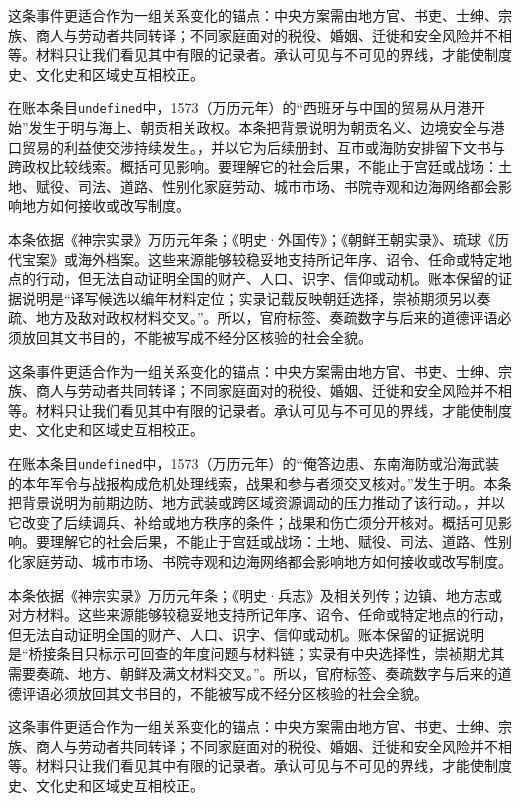 这条事件更适合作为一组关系变化的锚点：中央方案需由地方官、书吏、士绅、宗族、商人与劳动者共同转译；不同家庭面对的税役、婚姻、迁徙和安全风险并不相等。材料只让我们看见其中有限的记录者。承认可见与不可见的界线，才能使制度史、文化史和区域史互相校正。

在账本条目\texttt{undefined}中，1573（万历元年）的“西班牙与中国的贸易从月港开始”发生于明与海上、朝贡相关政权。本条把背景说明为朝贡名义、边境安全与港口贸易的利益使交涉持续发生。，并以它为后续册封、互市或海防安排留下文书与跨政权比较线索。概括可见影响。要理解它的社会后果，不能止于宫廷或战场：土地、赋役、司法、道路、性别化家庭劳动、城市市场、书院寺观和边海网络都会影响地方如何接收或改写制度。

本条依据《神宗实录》万历元年条；《明史·外国传》；《朝鲜王朝实录》、琉球《历代宝案》或海外档案。这些来源能够较稳妥地支持所记年序、诏令、任命或特定地点的行动，但无法自动证明全国的财产、人口、识字、信仰或动机。账本保留的证据说明是“译写候选以编年材料定位；实录记载反映朝廷选择，崇祯期须另以奏疏、地方及敌对政权材料交叉。”。所以，官府标签、奏疏数字与后来的道德评语必须放回其文书目的，不能被写成不经分区核验的社会全貌。

这条事件更适合作为一组关系变化的锚点：中央方案需由地方官、书吏、士绅、宗族、商人与劳动者共同转译；不同家庭面对的税役、婚姻、迁徙和安全风险并不相等。材料只让我们看见其中有限的记录者。承认可见与不可见的界线，才能使制度史、文化史和区域史互相校正。

在账本条目\texttt{undefined}中，1573（万历元年）的“俺答边患、东南海防或沿海武装的本年军令与战报构成危机处理线索，战果和参与者须交叉核对。”发生于明。本条把背景说明为前期边防、地方武装或跨区域资源调动的压力推动了该行动。，并以它改变了后续调兵、补给或地方秩序的条件；战果和伤亡须分开核对。概括可见影响。要理解它的社会后果，不能止于宫廷或战场：土地、赋役、司法、道路、性别化家庭劳动、城市市场、书院寺观和边海网络都会影响地方如何接收或改写制度。

本条依据《神宗实录》万历元年条；《明史·兵志》及相关列传；边镇、地方志或对方材料。这些来源能够较稳妥地支持所记年序、诏令、任命或特定地点的行动，但无法自动证明全国的财产、人口、识字、信仰或动机。账本保留的证据说明是“桥接条目只标示可回查的年度问题与材料链；实录有中央选择性，崇祯期尤其需要奏疏、地方、朝鲜及满文材料交叉。”。所以，官府标签、奏疏数字与后来的道德评语必须放回其文书目的，不能被写成不经分区核验的社会全貌。

这条事件更适合作为一组关系变化的锚点：中央方案需由地方官、书吏、士绅、宗族、商人与劳动者共同转译；不同家庭面对的税役、婚姻、迁徙和安全风险并不相等。材料只让我们看见其中有限的记录者。承认可见与不可见的界线，才能使制度史、文化史和区域史互相校正。

